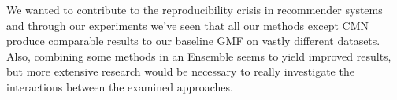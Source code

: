 We wanted to contribute to the reproducibility crisis in recommender systems and through our experiments we've seen that all our methods except CMN produce comparable results to our baseline GMF on vastly different datasets. Also, combining some methods in an Ensemble seems to yield improved results, but more extensive research would be necessary to really investigate the interactions between the examined approaches.
